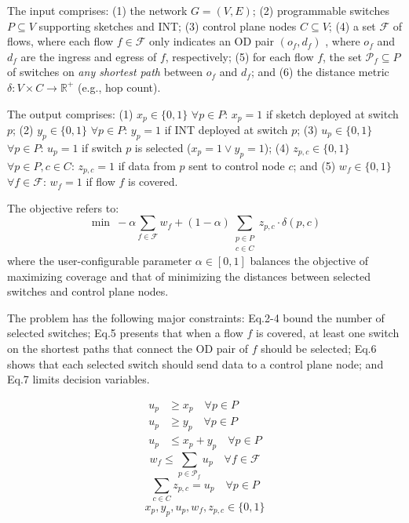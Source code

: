  The input comprises:
(1) the network $G = (V, E)$;
(2) programmable switches $P \subseteq V$ supporting sketches and INT;
(3) control plane nodes $C \subseteq V$;
(4) a set $\mathcal{F}$ of flows, where each flow $f \in \mathcal{F}$ only indicates an OD pair $(o_f, d_f)$ \cite{liu2016one,anup2022hetero}, where $o_f$ and $d_f$ are the ingress and egress of $f$, respectively; 
(5) for each flow $f$, the set $\mathcal{P}_f \subseteq P$ of switches on \emph{any shortest path} between $o_f$ and $d_f$;
and (6) the distance metric $\delta: V \times C \to \mathbb{R}^+$ (e.g., hop count).

 The output comprises:
(1) $x_p \in \{0,1\}$ $\forall p \in P$: $x_p=1$ if sketch deployed at switch $p$;
(2) $y_p \in \{0,1\}$ $\forall p \in P$: $y_p=1$ if INT deployed at switch $p$;
(3) $u_p \in \{0,1\}$ $\forall p \in P$: $u_p=1$ if switch $p$ is selected ($x_p =1 \lor y_p=1$);
(4) $z_{p,c} \in \{0,1\}$ $\forall p \in P, c \in C$: $z_{p,c}=1$ if data from $p$ sent to control node $c$;
and (5) $w_f \in \{0,1\}$ $\forall f \in \mathcal{F}$: $w_f=1$ if flow $f$ is covered.

 The objective refers to:
\begin{equation}
\min\ -\alpha \sum_{f \in \mathcal{F}} w_f + (1-\alpha) \sum_{\substack{p \in P \\ c \in C}} z_{p,c} \cdot \delta(p, c)
\label{eq:objective}
\end{equation}
where the user-configurable parameter $\alpha \in [0,1]$ balances the objective of maximizing coverage and that of minimizing the distances between selected switches and control plane nodes.

 The problem has the following major constraints: Eq.2-4 bound the number of selected switches; Eq.5 presents that when a flow $f$ is covered, at least one switch on the shortest paths that connect the OD pair of $f$ should be selected; Eq.6 shows that each selected switch should send data to a control plane node; and Eq.7 limits decision variables. 

\vspace{-7pt}
{\footnotesize
\begin{align}
u_p &\geq x_p \quad \forall p \in P \\
u_p &\geq y_p \quad \forall p \in P \\
u_p &\leq x_p + y_p \quad \forall p \in P 
\end{align}
\begin{equation}
    w_f \leq \sum_{p \in \mathcal{P}_f} u_p \quad \forall f \in \mathcal{F}
\end{equation}
\begin{equation}
    \sum_{c \in C} z_{p,c} = u_p \quad \forall p \in P
\end{equation}
\begin{equation}
    x_p, y_p, u_p, w_f, z_{p,c} \in \{0,1\}
\end{equation}}

